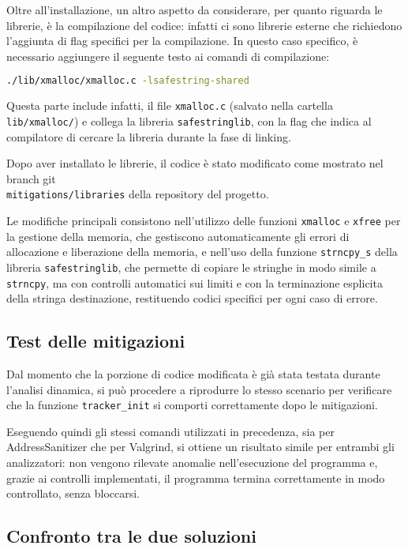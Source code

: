 \medskip
Oltre all'installazione, un altro aspetto da considerare, per quanto riguarda le
librerie, è la compilazione del codice: infatti ci sono librerie esterne che richiedono
l'aggiunta di flag specifici per la compilazione. In questo caso specifico, è necessario
aggiungere il seguente testo ai comandi di compilazione:
\begin{lstlisting}[language=bash, numbers=none]
./lib/xmalloc/xmalloc.c -lsafestring-shared
\end{lstlisting}
Questa parte include infatti, il file \texttt{xmalloc.c} (salvato nella cartella
\texttt{lib/xmalloc/}) e collega la libreria \texttt{safestringlib}, con la flag
che indica al compilatore di cercare la libreria durante la fase di linking.

Dopo aver installato le librerie, il codice è stato modificato come mostrato nel
branch git \\ \texttt{mitigations/libraries} della repository del progetto.

Le modifiche principali consistono nell'utilizzo delle funzioni \texttt{xmalloc}
e \texttt{xfree} per la gestione della memoria, che gestiscono automaticamente
gli errori di allocazione e liberazione della memoria, e nell'uso della funzione
\texttt{strncpy\_s} della libreria \texttt{safestringlib}, che permette di
copiare le stringhe in modo simile a \texttt{strncpy}, ma con controlli
automatici sui limiti e con la terminazione esplicita della stringa destinazione,
restituendo codici specifici per ogni caso di errore.

\subsection*{Test delle mitigazioni}
\label{sec:test-mitigations}

Dal momento che la porzione di codice modificata è già stata testata durante l'analisi
dinamica, si può procedere a riprodurre lo stesso scenario per verificare che la
funzione \texttt{tracker\_init} si comporti correttamente dopo le mitigazioni.

Eseguendo quindi gli stessi comandi utilizzati in precedenza, sia per AddressSanitizer
che per Valgrind, si ottiene un risultato simile per entrambi gli analizzatori: non
vengono rilevate anomalie nell'esecuzione del programma e, grazie ai controlli
implementati, il programma termina correttamente in modo controllato, senza
bloccarsi.

\subsection*{Confronto tra le due soluzioni}
\label{sec:comparison-case-study}

